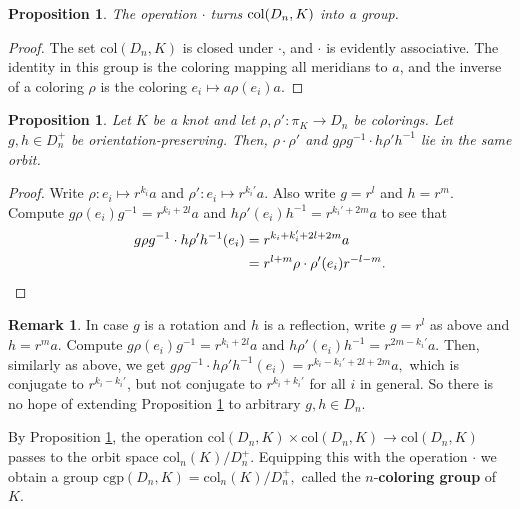\documentclass{article}
\newtheorem{proposition}[theorem]{Proposition}
\theoremstyle{definition}
\newtheorem{remark}[theorem]{Remark}
\begin{document}
\begin{proposition}
The operation $\cdot$ turns $\textup{col}(D_n, K)$ into a group.
\end{proposition}

\begin{proof}
The set $\text{col}(D_n, K)$ is closed under $\cdot$, and $\cdot$ is evidently associative. The identity in this group is the coloring mapping all meridians to $a$, and the inverse of a coloring $\rho$ is the coloring $e_i \mapsto a \rho(e_i) a$.
\end{proof}

\begin{proposition}\label{prop: dihedral-composition-of-colorings-passes-to-orientation-preserving-orbits}
Let $K$ be a knot and let $\rho, \rho': \pi_K \rightarrow D_n$ be colorings. Let $g,h \in D_n^+$ be orientation-preserving. Then, $\rho \cdot \rho'$ and $g\rho g^{-1} \cdot h\rho' h^{-1}$ lie in the same orbit.
\end{proposition}

\begin{proof} Write $\rho: e_i \mapsto r^{k_i} a$ and $\rho': e_i \mapsto r^{k_i'} a$. Also write $g = r^l$ and $h = r^m$. Compute $g \rho(e_i) g^{-1}  = r^{k_i + 2l}a$ and $h \rho'(e_i) h^{-1} =  r^{k_i' + 2m}a$ to see that
\begin{align*}
g\rho g^{-1}\cdot h\rho' h^{-1} (e_i)
& = r^{k_i + k_i' + 2l + 2m}a \\
& = r^{l+m}\rho \cdot \rho' (e_i) r^{-l-m}.\qedhere
\end{align*}
\end{proof}

\begin{remark}
In case $g$ is a rotation and $h$ is a reflection, write $g = r^l$ as above and $h = r^ma$. Compute $g \rho(e_i) g^{-1}  = r^{k_i + 2l}a$ and $h\rho'(e_i)h^{-1} = r^{2m - k_i'}a$. Then, similarly as above, we get $g\rho g^{-1}\cdot h\rho' h^{-1} (e_i)
 = r^{k_i - k_i' + 2l + 2m}a,$
which is conjugate to $r^{k_i - k_i'}$, but not conjugate to $r^{k_i + k_i'}$ for all $i$ in general. So there is no hope of extending Proposition \ref{prop: dihedral-composition-of-colorings-passes-to-orientation-preserving-orbits} to arbitrary $g,h \in D_n$.
\end{remark}

By Proposition \ref{prop: dihedral-composition-of-colorings-passes-to-orientation-preserving-orbits}, the operation $\text{col}(D_n, K) \times \text{col}(D_n, K) \rightarrow \text{col}(D_n, K)$ passes to the orbit space $\text{col}_n(K)/D_n^+$.
Equipping this with the operation $\cdot$ we obtain a group
$\text{cgp}(D_n, K) = \text{col}_n(K)/D_n^+,$ called the $n$-\textbf{coloring group} of $K$.
\end{document}
